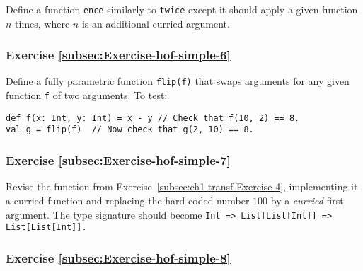Define a function \lstinline!ence!
similarly to \lstinline!twice!
except it should apply a given function $n$ times, where $n$ is
an additional curried argument.

\subsubsection{Exercise \label{subsec:Exercise-hof-simple-6}\ref{subsec:Exercise-hof-simple-6}}

Define a fully parametric function \lstinline!flip(f)!
that swaps arguments for any given function \lstinline!f!
of two arguments. To test: 

\begin{lstlisting}
def f(x: Int, y: Int) = x - y // Check that f(10, 2) == 8.
val g = flip(f)  // Now check that g(2, 10) == 8.
\end{lstlisting}

\subsubsection{Exercise \label{subsec:Exercise-hof-simple-7}\ref{subsec:Exercise-hof-simple-7}}

Revise the function from Exercise~\ref{subsec:ch1-transf-Exercise-4},
implementing it a curried function and replacing the hard-coded number
$100$ by a \emph{curried} first argument. The type signature should
become \texttt{}\lstinline!Int => List[List[Int]] => List[List[Int]]!\texttt{.}

\subsubsection{Exercise \label{subsec:Exercise-hof-simple-8}\ref{subsec:Exercise-hof-simple-8}}

